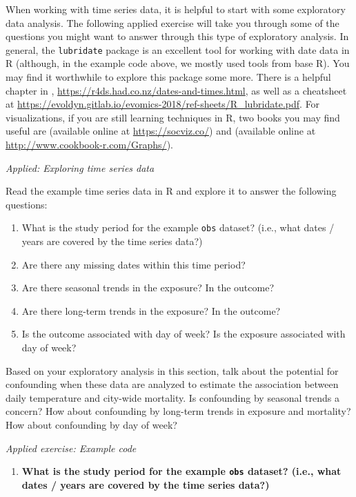 \documentclass[
]{book}
\providecommand{\tightlist}{%
  \setlength{\itemsep}{0pt}\setlength{\parskip}{0pt}}
\begin{document}
When working with time series data, it is helpful to start with some exploratory
data analysis. The following applied exercise will take you through some of the
questions you might want to answer through this type of exploratory analysis. In
general, the \texttt{lubridate} package is an excellent tool for working with date data
in R (although, in the example code above, we mostly used tools from base R).
You may find it worthwhile to explore this package some more. There is a helpful
chapter in \citet{wickham2016r}, \url{https://r4ds.had.co.nz/dates-and-times.html}, as well
as a cheatsheet at
\url{https://evoldyn.gitlab.io/evomics-2018/ref-sheets/R_lubridate.pdf}. For
visualizations, if you are still learning techniques in R, two books
you may find useful are
\citet{healy2018data} (available online at \url{https://socviz.co/}) and \citet{chang2018r}
(available online at \url{http://www.cookbook-r.com/Graphs/}).

\emph{Applied: Exploring time series data}

Read the example time series data in R and explore it to answer the following
questions:

\begin{enumerate}
\def\labelenumi{\arabic{enumi}.}
\tightlist
\item
  What is the study period for the example \texttt{obs} dataset? (i.e., what
  dates / years are covered by the time series data?)
\item
  Are there any missing dates within this time period?
\item
  Are there seasonal trends in the exposure? In the outcome?
\item
  Are there long-term trends in the exposure? In the outcome?
\item
  Is the outcome associated with day of week? Is the exposure associated
  with day of week?
\end{enumerate}

Based on your exploratory analysis in this section, talk about the potential
for confounding when these data are analyzed to estimate the association between
daily temperature and city-wide mortality. Is confounding by seasonal trends
a concern? How about confounding by long-term trends in exposure and mortality?
How about confounding by day of week?

\emph{Applied exercise: Example code}

\begin{enumerate}
\def\labelenumi{\arabic{enumi}.}
\tightlist
\item
  \textbf{What is the study period for the example \texttt{obs} dataset? (i.e., what
  dates / years are covered by the time series data?)}
\end{enumerate}
\end{document}
